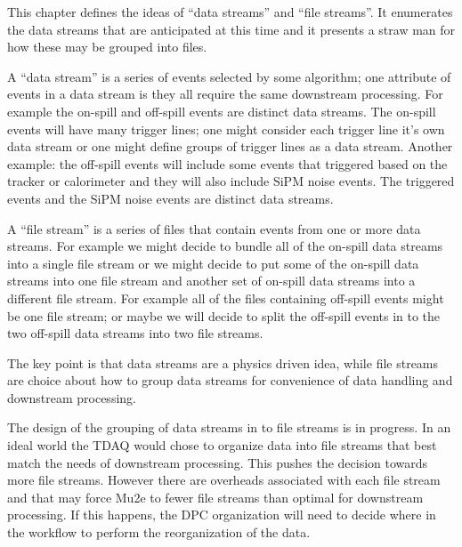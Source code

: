 This chapter defines the ideas of ``data streams'' and ``file streams''.
It enumerates the data streams that are anticipated at this time
and it presents a straw man for how these may be grouped into files.


A ``data stream'' is a series of events selected by some algorithm;
one attribute of events in a data stream is they all require the same downstream processing.
For example the on-spill and off-spill events are distinct data streams.
The on-spill events will have many trigger lines; one might consider each trigger
line it's own data stream or one might define groups of trigger lines as a data stream.
Another example: the off-spill events will include some events that triggered based on
the tracker or calorimeter and they will also include SiPM noise events.
The triggered events and the SiPM noise events are distinct data streams.

A ``file stream'' is a series of files that contain events from one or more data streams.
For example we might decide to bundle all of the on-spill data streams into a single
file stream or we might decide to put some of the on-spill data streams into one file
stream and another set of on-spill data streams into a different file stream.
For example all of the files containing off-spill events might be one file stream;
or maybe we will decide to split the off-spill events in to
the two off-spill data streams into two file streams.

The key point is that data streams are a physics driven idea,
while file streams are choice about how to group data streams for convenience of data handling and downstream processing.


The design of the grouping of data streams in to file streams
is in progress.
In an ideal world the TDAQ would chose to organize data into file streams that best match the needs
of downstream processing.
This pushes the decision towards more file streams.
However there are overheads associated with each file stream and that may force Mu2e to fewer file streams
than optimal for downstream processing.
If this happens, the DPC organization will need to decide where in the workflow to perform
the reorganization of the data.

